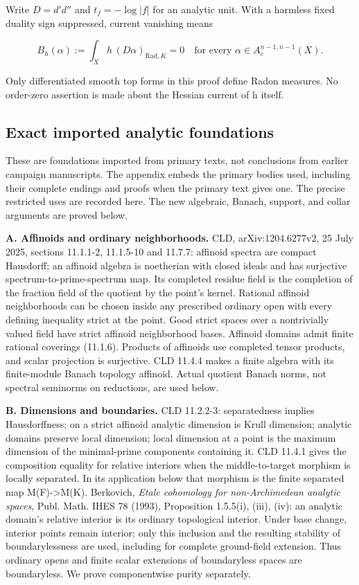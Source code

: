 \documentclass[
  10pt,
]{article}
\begin{document}
Write \(D=d'd''\) and \(t_f=-\log|f|\) for an analytic unit.
With a harmless fixed duality sign suppressed, current vanishing means

\[
 B_h(\alpha):=\int_X h\,(D\alpha)_{\mathrm{Rad},K}=0
 \quad\text{for every }\alpha\in A_c^{n-1,n-1}(X).             \tag{1}
\]

Only differentiated smooth top forms in this proof define Radon
measures. No order-zero assertion is made about the Hessian current of h
itself.

\subsection{Exact imported analytic
foundations}\label{exact-imported-analytic-foundations}

These are foundations imported from primary texts, not conclusions from
earlier campaign manuscripts. The appendix embeds the primary bodies
used, including their complete endings and proofs when the primary text
gives one. The precise restricted uses are recorded here. The new
algebraic, Banach, support, and collar arguments are proved below.

\textbf{A. Affinoids and ordinary neighborhoods.} CLD,
arXiv:1204.6277v2, 25 July 2025, sections 11.1.1-2, 11.1.5-10 and
11.7.7: affinoid spectra are compact Hausdorff; an affinoid algebra is
noetherian with closed ideals and has surjective
spectrum-to-prime-spectrum map. Its completed residue field is the
completion of the fraction field of the quotient by the point's kernel.
Rational affinoid neighborhoods can be chosen inside any prescribed
ordinary open with every defining inequality strict at the point. Good
strict spaces over a nontrivially valued field have strict affinoid
neighborhood bases. Affinoid domains admit finite rational coverings
(11.1.6). Products of affinoids use completed tensor products, and
scalar projection is surjective. CLD 11.4.4 makes a finite algebra with
its finite-module Banach topology affinoid. Actual quotient Banach
norms, not spectral seminorms on reductions, are used below.

\textbf{B. Dimensions and boundaries.} CLD 11.2.2-3: separatedness
implies Hausdorffness; on a strict affinoid analytic dimension is Krull
dimension; analytic domains preserve local dimension; local dimension at
a point is the maximum dimension of the minimal-prime components
containing it. CLD 11.4.1 gives the composition equality for relative
interiors when the middle-to-target morphism is locally separated. In
its application below that morphism is the finite separated map
M(F)-\textgreater M(K). Berkovich, \emph{Etale cohomology for
non-Archimedean analytic spaces}, Publ. Math. IHES 78 (1993),
Proposition 1.5.5(i), (iii), (iv): an analytic domain's relative
interior is its ordinary topological interior. Under base change,
interior points remain interior; only this inclusion and the resulting
stability of boundarylessness are used, including for complete
ground-field extension.
Thus ordinary opens and finite scalar extensions of boundaryless spaces
are boundaryless. We prove componentwise purity separately.
\end{document}
